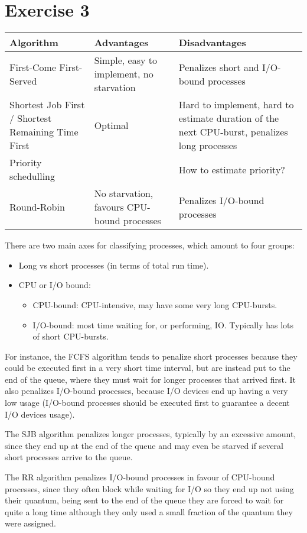 {\section{Exercise 3}
\begin{center}
\begin{tabular}{p{25mm} | p{60mm} | p{60mm}}
    \textbf{Algorithm} & \textbf{Advantages} & \textbf{Disadvantages} \\ \hline
    First-Come First-Served & Simple, easy to implement, no starvation & Penalizes short and I/O-bound processes \\ \hline
    Shortest Job First / Shortest Remaining Time First & Optimal & Hard to implement, hard to estimate duration of the next CPU-burst, penalizes long processes \\ \hline
    Priority schedulling & & How to estimate priority? \\ \hline
    Round-Robin & No starvation, favours CPU-bound processes & Penalizes I/O-bound processes
\end{tabular}
\end{center}
There are two main axes for classifying processes, which amount to four groups:
\begin{itemize}
    \item Long vs short processes (in terms of total run time).
    \item CPU or I/O bound:
    \begin{itemize}
        \item CPU-bound: CPU-intensive, may have some very long CPU-bursts.
        \item I/O-bound: most time waiting for, or performing, IO. Typically has lots of short CPU-bursts.
    \end{itemize}
\end{itemize}
For instance, the FCFS algorithm tends to penalize short processes because they could be executed first in a very short time interval, but are instead put to the end of the queue, where they must wait for longer processes that arrived first. It also penalizes I/O-bound processes, because I/O devices end up having a very low usage (I/O-bound processes should be executed first to guarantee a decent I/O devices usage).

The SJB algorithm penalizes longer processes, typically by an excessive amount, since they end up at the end of the queue and may even be starved if several short processes arrive to the queue.

The RR algorithm penalizes I/O-bound processes in favour of CPU-bound processes, since they often block while waiting for I/O so they end up not using their quantum, being sent to the end of the queue they are forced to wait for quite a long time although they only used a small fraction of the quantum they were assigned.

}
